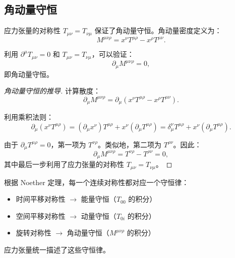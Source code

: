 \subsection{角动量守恒}

应力张量的对称性 $T_{\mu\nu} = T_{\nu\mu}$ 保证了角动量守恒。角动量密度定义为：
\begin{equation}
    M^{\mu\nu\rho} = x^\nu T^{\mu\rho} - x^\rho T^{\mu\nu}.
\end{equation}

\begin{theorem}[角动量守恒]
利用 $\partial^\mu T_{\mu\nu} = 0$ 和 $T_{\mu\nu} = T_{\nu\mu}$，可以验证：
\begin{equation}
    \partial_\mu M^{\mu\nu\rho} = 0,
\end{equation}
即角动量守恒。
\end{theorem}

\begin{proof}[角动量守恒的推导]
计算散度：
\begin{equation}
    \partial_\mu M^{\mu\nu\rho} = \partial_\mu (x^\nu T^{\mu\rho} - x^\rho T^{\mu\nu}).
\end{equation}

利用乘积法则：
\begin{equation}
    \partial_\mu (x^\nu T^{\mu\rho}) = (\partial_\mu x^\nu) T^{\mu\rho} + x^\nu (\partial_\mu T^{\mu\rho}) = \delta_\mu^\nu T^{\mu\rho} + x^\nu (\partial_\mu T^{\mu\rho}).
\end{equation}

由于 $\partial_\mu T^{\mu\rho} = 0$，第一项为 $T^{\nu\rho}$。类似地，第二项为 $T^{\rho\nu}$。因此：
\begin{equation}
    \partial_\mu M^{\mu\nu\rho} = T^{\nu\rho} - T^{\rho\nu} = 0,
\end{equation}
其中最后一步利用了应力张量的对称性 $T_{\mu\nu} = T_{\nu\mu}$。
\end{proof}

\begin{note}[对称性与守恒律的对应]
根据 Noether 定理，每一个连续对称性都对应一个守恒律：
\begin{itemize}
    \item 时间平移对称性 $\to$ 能量守恒（$T_{00}$ 的积分）
    \item 空间平移对称性 $\to$ 动量守恒（$T_{0i}$ 的积分）
    \item 旋转对称性 $\to$ 角动量守恒（$M^{\mu\nu\rho}$ 的积分）
\end{itemize}
应力张量统一描述了这些守恒律。
\end{note}

